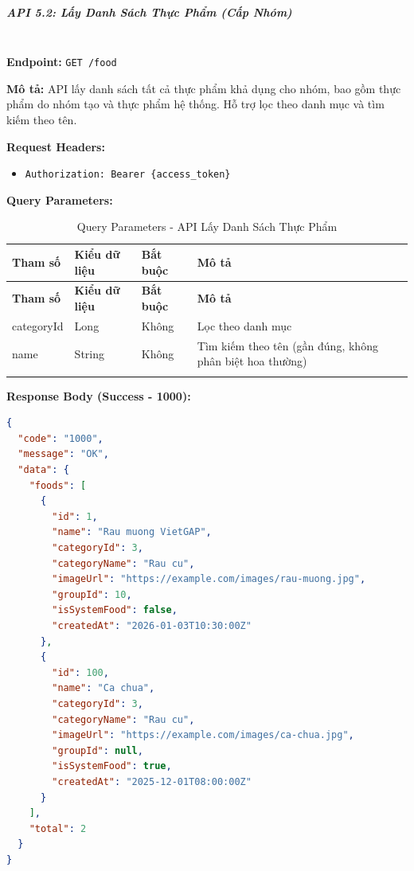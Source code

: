 \subparagraph{API 5.2: Lấy Danh Sách Thực Phẩm (Cấp Nhóm)}~\\

\textbf{Endpoint:} \texttt{GET /food}

\textbf{Mô tả:} API lấy danh sách tất cả thực phẩm khả dụng cho nhóm, bao gồm thực phẩm do nhóm tạo và thực phẩm hệ thống. Hỗ trợ lọc theo danh mục và tìm kiếm theo tên.

\textbf{Request Headers:}
\begin{itemize}
    \item \texttt{Authorization: Bearer \{access\_token\}}
\end{itemize}

\textbf{Query Parameters:}

\small
\begin{longtable}{|>{\raggedright\arraybackslash}p{3.5cm}|>{\raggedright\arraybackslash}p{2.5cm}|>{\raggedright\arraybackslash}p{2cm}|>{\raggedright\arraybackslash}p{5.5cm}|}
\hline
\textbf{Tham số} & \textbf{Kiểu dữ liệu} & \textbf{Bắt buộc} & \textbf{Mô tả} \\
\hline
\endfirsthead
\hline
\textbf{Tham số} & \textbf{Kiểu dữ liệu} & \textbf{Bắt buộc} & \textbf{Mô tả} \\
\hline
\endhead
categoryId & Long & Không & Lọc theo danh mục \\
\hline
name & String & Không & Tìm kiếm theo tên (gần đúng, không phân biệt hoa thường) \\
\hline
\caption{Query Parameters - API Lấy Danh Sách Thực Phẩm}
\end{longtable}

\textbf{Response Body (Success - 1000):}

\begin{lstlisting}[language=json, caption=Response thanh cong API 5.2]
{
  "code": "1000",
  "message": "OK",
  "data": {
    "foods": [
      {
        "id": 1,
        "name": "Rau muong VietGAP",
        "categoryId": 3,
        "categoryName": "Rau cu",
        "imageUrl": "https://example.com/images/rau-muong.jpg",
        "groupId": 10,
        "isSystemFood": false,
        "createdAt": "2026-01-03T10:30:00Z"
      },
      {
        "id": 100,
        "name": "Ca chua",
        "categoryId": 3,
        "categoryName": "Rau cu",
        "imageUrl": "https://example.com/images/ca-chua.jpg",
        "groupId": null,
        "isSystemFood": true,
        "createdAt": "2025-12-01T08:00:00Z"
      }
    ],
    "total": 2
  }
}
\end{lstlisting}

